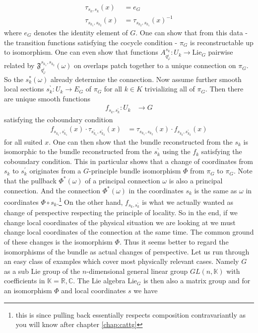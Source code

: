 \begin{enumerate}
\begin{align*}
  \tau_{s_{k},s_{k}}(x)
  &=
  e_{G}
  \\
  \tau_{s_{k_{1}},s_{k_{2}}}(x) 
  &=
  \tau_{s_{k_{2}},s_{k_{1}}}(x)^{-1}
\end{align*}
where $e_{G}$ denotes the identity element of $G$. One can show that from this data - the transition functions satisfying the cocycle condition - $\pi_{G}$ is reconstructable up to isomorphism. One can even show that functions $A_{q_{\varphi}^{i}}^{s_{k}} \colon U_{k} \rightarrow \mathrm{Lie}_{G}$ pairwise related by $\mathfrak{F}_{q_{\varphi}^{i}}^{s_{k_{1}},s_{k_{2}}}(\omega)$ on overlaps patch together to a unique connection on $\pi_{G}$. So the $s_{k}^{\ast}(\omega)$ already determine the connection. Now assume further smooth local sections $s_{k}^{\backprime} \colon U_{k} \rightarrow E_{G}$ of $\pi_{G}$ for all $k \in K$ trivializing all of $\pi_{G}$. Then there are unique smooth functions
\begin{align*}
  f_{s_{k},s_{k}^{\backprime}}
  \colon
  U_{k}
  &\rightarrow
  G
\end{align*}
satisfying the coboundary condition
\begin{align*}
  f_{s_{k_{1}},s_{k_{1}}^{\backprime}}(x)
  \cdot
  \tau_{s_{k_{1}}^{\backprime},s_{k_{2}}^{\backprime}}(x)
  &=
  \tau_{s_{k_{1}},s_{k_{2}}}(x)
  \cdot
  f_{s_{k_{2}},s_{k_{2}}^{\backprime}}(x)
\end{align*}
for all suited $x$. One can then show that the bundle reconstructed from the $s_{k}$ is isomorphic to the bundle reconstructed from the $s_{k}^{\backprime}$ using the $f_{k}$ satisfying the coboundary condition. This in particular shows that a change of coordinates from $s_{k}$ to $s_{k}^{\prime}$ originates from a $G$-principle bundle isomorphism $\Phi$ from $\pi_{G}$ to $\pi_{G}$. Note that the pullback $\Phi^{\ast}(\omega)$ of a principal connection $\omega$ is also a principal connection. And the connection $\Phi^{\ast}(\omega)$ in the coordinates $s_{k}$ is the same as $\omega$ in coordinates $\Phi \circ s_{k}$.\footnote{this is since pulling back essentially respects composition contravariantly as you will know after chapter \ref{chap:cattg}} On the other hand, $f_{s_{k},s_{k}^{\backprime}}$ is what we actually wanted as change of perspective respecting the principle of locality. So in the end, if we change local coordinates of the physical situation we are looking at we must change local coordinates of the connection at the same time. The common ground of these changes is the isomorphism $\Phi$. Thus it seems better to regard the isomorphisms of the bundle as actual changes of perspective. Let us run through an easy class of examples which cover most physically relevant cases. Namely $G$ as a sub Lie group of the $n$-dimensional general linear group $GL(n,\mathbb{K})$ with coefficients in $\mathbb{K} = \mathbb{R},\mathbb{C}$. The Lie algebra $\mathrm{Lie}_{G}$ is then also a matrix group and for an isomorphism $\Phi$ and local coordinates $s$ we have

\end{enumerate}

